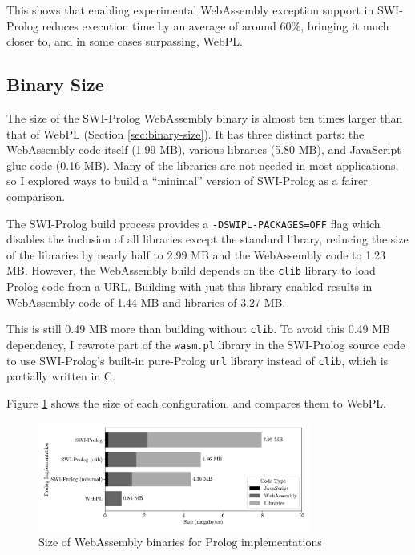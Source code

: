 This shows that enabling experimental WebAssembly exception support in SWI-Prolog reduces execution time by an average of around 60\%, bringing it much closer to, and in some cases surpassing, WebPL.

\subsection{Binary Size}

\label{sec:binary-size-opt}

The size of the SWI-Prolog WebAssembly binary is almost ten times larger than that of WebPL (Section \ref{sec:binary-size}). It has three distinct parts: the WebAssembly code itself (1.99 MB), various libraries (5.80 MB), and JavaScript glue code (0.16 MB). Many of the libraries are not needed in most applications, so I explored ways to build a ``minimal'' version of SWI-Prolog as a fairer comparison.

The SWI-Prolog build process provides a \texttt{-DSWIPL-PACKAGES=OFF} flag which disables the inclusion of all libraries except the standard library, reducing the size of the libraries by nearly half to 2.99 MB and the WebAssembly code to 1.23 MB. However, the WebAssembly build depends on the \texttt{clib} library to load Prolog code from a URL. Building with just this library enabled results in WebAssembly code of 1.44 MB and libraries of 3.27 MB.

This is still 0.49 MB more than building without \texttt{clib}. To avoid this 0.49 MB dependency, I rewrote part of the \texttt{wasm.pl} library in the SWI-Prolog source code to use SWI-Prolog's built-in pure-Prolog \texttt{url} library instead of \texttt{clib}, which is partially written in C.

Figure \ref{fig:binary-size} shows the size of each configuration, and compares them to WebPL.

\begin{figure}[H]
\centering
\includegraphics[width=0.8\textwidth]{binary_size.pdf}
\caption{Size of WebAssembly binaries for Prolog implementations}
\label{fig:binary-size}
\end{figure}

